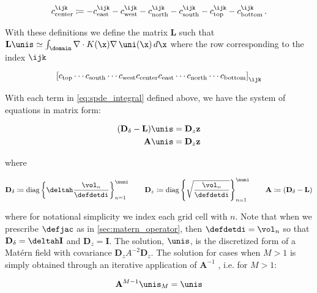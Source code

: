 \documentclass[alpha-refs]{wiley-article}
\begin{document}
\begin{linenomath*}\begin{equation*}
    c_\text{center}^\ijk \coloneqq
        - c_\text{east}^\ijk - c_\text{west}^\ijk
        - c_\text{north}^\ijk - c_\text{south}^\ijk
        - c_\text{top}^\ijk - c_\text{bottom}^\ijk \, .
\end{equation*}\end{linenomath*}
With these definitions we define the matrix $\mathbf{L}$ such that
$\mathbf{L} \unis \simeq \int_{\domain} \nabla\cdot K(\x)\nabla \, \uni(\x)\,d\x$
where the row corresponding to the index $\ijk$
\begin{linenomath*}\begin{equation*}
    \left[ c_\text{top} \cdots c_\text{south} \cdots
           c_\text{west} c_\text{center} c_\text{east} \cdots
           c_\text{north} \cdots c_\text{bottom}
       \right]_{\ijk}
\end{equation*}\end{linenomath*}

With each term in \cref{eq:spde_integral} defined above, we have the system of
equations in matrix form:
\begin{linenomath*}\begin{equation}
    \begin{aligned}
        (\mathbf{D}_\delta - \mathbf{L}) \unis &= \mathbf{D}_z\mathbf{z}\\
        \mathbf{A}\unis &= \mathbf{D}_z\mathbf{z}
    \end{aligned}
    \label{eq:fv_spde}
\end{equation}\end{linenomath*}
where
\begin{linenomath*}\begin{equation*}
    \begin{aligned}
        \mathbf{D}_\delta \coloneqq \text{diag}
            \left\{
                \deltah\dfrac{\vol_n}{\defdetdi}
            \right\}_{n=1}^{\nuni}
            \qquad
        \mathbf{D}_z \coloneqq \text{diag}
            \left\{
                \sqrt{\dfrac{\vol_n}{\defdetdi}}
            \right\}_{n=1}^{\nuni}
            \qquad
            \mathbf{A} \coloneqq \left(\mathbf{D}_\delta - \mathbf{L}\right)
    \end{aligned}
\end{equation*}\end{linenomath*}
where for notational simplicity we index each grid cell with $n$.
Note that when we prescribe $\defjac$ as in \cref{sec:matern_operator},
then $\defdetdi = \vol_n$ so that $\mathbf{D}_\delta = \deltah \mathbf{I}$
and $\mathbf{D}_z = \mathbf{I}$.
The solution, $\unis$, is the discretized form of a Mat\'ern field with
covariance $\mathbf{D}_z A^{-2} \mathbf{D}_z$.
The solution for cases when $M>1$ is simply obtained through an iterative
application of $\mathbf{A}^{-1}$ , i.e. for $M>1$:
\begin{linenomath*}\begin{equation*}
    \mathbf{A}^{M-1} \unis_M = \unis
\end{equation*}\end{linenomath*}
\end{document}
